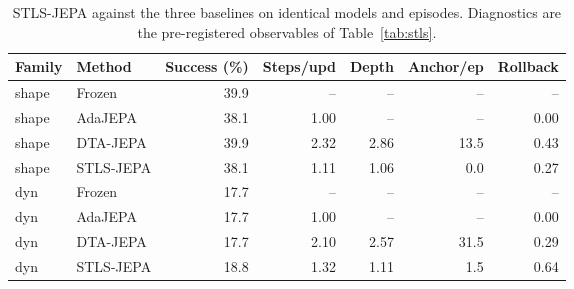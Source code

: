 \begin{table}[t]\centering
\caption{STLS-JEPA against the three baselines on identical models and episodes. Diagnostics are the pre-registered observables of Table~\ref{tab:stls}.}
\label{tab:stlsres}\small
\begin{tabular}{llrrrrr}
\toprule
Family & Method & Success (\%) & Steps/upd & Depth & Anchor/ep & Rollback \\
\midrule
shape & Frozen & 39.9 & -- & -- & -- & -- \\
shape & AdaJEPA & 38.1 & 1.00 & -- & -- & 0.00 \\
shape & DTA-JEPA & 39.9 & 2.32 & 2.86 & 13.5 & 0.43 \\
shape & STLS-JEPA & 38.1 & 1.11 & 1.06 & 0.0 & 0.27 \\
\midrule
dyn & Frozen & 17.7 & -- & -- & -- & -- \\
dyn & AdaJEPA & 17.7 & 1.00 & -- & -- & 0.00 \\
dyn & DTA-JEPA & 17.7 & 2.10 & 2.57 & 31.5 & 0.29 \\
dyn & STLS-JEPA & 18.8 & 1.32 & 1.11 & 1.5 & 0.64 \\
\bottomrule
\end{tabular}\end{table}